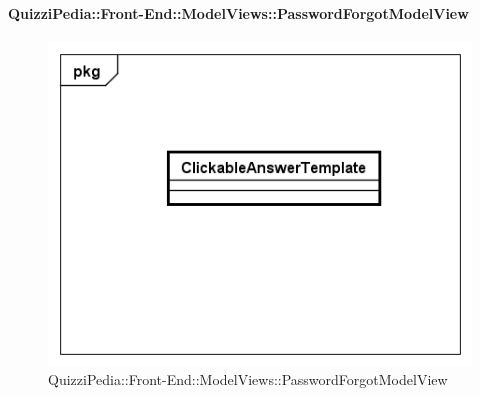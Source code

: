 	\paragraph{QuizziPedia::Front-End::ModelViews::PasswordForgotModelView}
	
	\label{QuizziPedia::Front-End::ModelViews::PasswordForgotModelView}
	
	\begin{figure}[ht]
		\centering
		\includegraphics[scale=0.5,keepaspectratio]{UML/Classi/Front-End/QuizziPedia_Front-end_Templates_ClickableAnswerTemplate.png}
		\caption{QuizziPedia::Front-End::ModelViews::PasswordForgotModelView}
	\end{figure} \FloatBarrier
	
